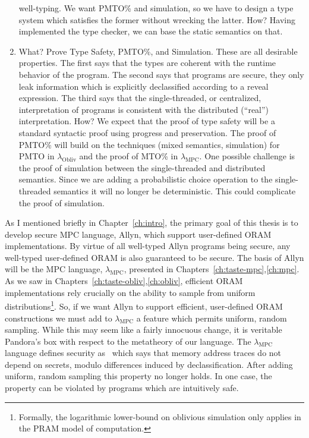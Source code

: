\documentclass{report}
\newcommand{\lang}{Allyn\xspace}
\newcommand{\mpc}{\ensuremath{\lambda_{\mathrm{MPC}}}\xspace}
\newcommand{\obliv}{\ensuremath{\lambda_{\mathrm{Obliv}}}\xspace}
\begin{document}
\begin{enumerate}
  well-typing. We want PMTO\% and simulation, so we have to design a type system which satisfies the former without wrecking the latter.
  How? Having implemented the type checker, we can base the static semantics on that.
\item What? Prove Type Safety, PMTO\%, and Simulation. These are all desirable properties. The first says that the types are coherent with
  the runtime behavior of the program. The second says that programs are secure, they only leak information which is explicitly declassified
  according to a reveal expression. The third says that the single-threaded, or centralized, interpretation of programs is consistent with
  the distributed (``real'') interpretation. How? We expect that the proof of type safety will be a standard syntactic proof using progress
  and preservation. The proof of PMTO\% will build on the techniques (mixed semantics, simulation) for PMTO in \obliv and the proof of MTO\%
  in \mpc. One possible challenge is the proof of simulation between the single-threaded and distributed semantics. Since we are adding a
  probabilistic choice operation to the single-threaded semantics it will no longer be deterministic. This could complicate the proof of
  simulation.
\end{enumerate}

As I mentioned briefly in Chapter~\ref{ch:intro}, the primary goal of this thesis is to develop secure MPC language, \lang, which
support user-defined ORAM implementations. By virtue of all well-typed \lang programs being secure, any well-typed user-defined ORAM
is also guaranteed to be secure. The basis of \lang will be the MPC language, \mpc, presented in Chapters~\ref{ch:taste-mpc},\ref{ch:mpc}.
As we saw in Chapters~\ref{ch:taste-obliv},\ref{ch:obliv}, efficient ORAM implementations rely crucially on the ability to sample from
uniform distributions\footnote{Formally, the logarithmic lower-bound on oblivious simulation only applies in the PRAM model of computation.}.
So, if we want \lang to support efficient, user-defined ORAM constructions we must add to \mpc a feature which permits uniform, random sampling.
While this may seem like a fairly innocuous change, it is veritable Pandora's box with respect to the metatheory of our language. The \mpc
language defines security as~ which says that memory address traces do not depend on secrets, modulo differences induced
by declassification. After adding uniform, random sampling this property no longer holds. In one case, the property can be violated by programs
which are intuitively safe.
\end{document}
